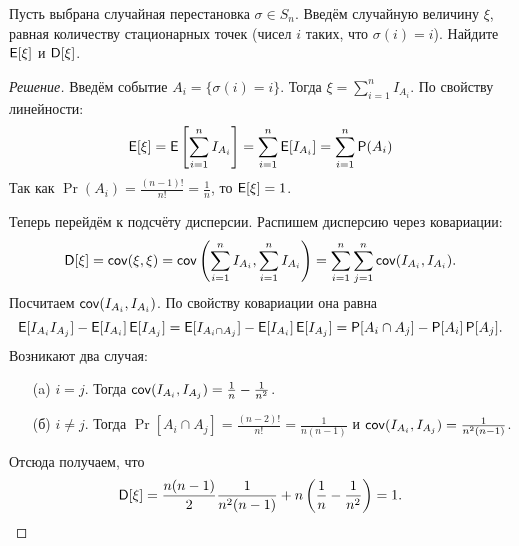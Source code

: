 \begin{problem}
    Пусть выбрана случайная перестановка \(\sigma \in S_n\). Введём случайную величину \(\xi\), равная количеству стационарных точек (чисел \(i\) таких, что \(\sigma(i) = i\)). Найдите \(\operatorname{\mathsf{E}}[\xi]\) и \(\operatorname{\mathsf{D}}[\xi]\).
\end{problem}
\begin{proof}[Решение]
    Введём событие \(A_i = \{\sigma(i) = i\}\). Тогда \(\xi = \sum\limits_{i = 1}^{n} I_{A_i}\).
    По свойству линейности:
    \[\operatorname{\mathsf{E}}[\xi] = \operatorname{\mathsf{E}}\left[\sum_{i = 1}^{n} I_{A_i}\right] = \sum_{i = 1}^{n} \operatorname{\mathsf{E}}[I_{A_i}] = \sum_{i = 1}^{n} \operatorname{\mathsf{P}}(A_i)\]
    Так как \(\Pr(A_i) = \frac{(n - 1)!}{n!} = \frac{1}{n}\), то \(\operatorname{\mathsf{E}}[\xi] = 1\).
    
    Теперь перейдём к подсчёту дисперсии. Распишем дисперсию через ковариации:
    \[\operatorname{\mathsf{D}}[\xi] = \operatorname{\mathsf{cov}}(\xi, \xi) = \operatorname{\mathsf{cov}}\left(\sum_{i = 1}^{n} I_{A_i}, \sum_{i = 1}^{n} I_{A_i}\right) = \sum_{i = 1}^{n} \sum_{j = 1}^{n} \operatorname{\mathsf{cov}}(I_{A_i}, I_{A_i}).\]
    Посчитаем \(\operatorname{\mathsf{cov}}(I_{A_i}, I_{A_i})\). По свойству ковариации она равна \[\operatorname{\mathsf{E}}[I_{A_i}I_{A_j}] - \operatorname{\mathsf{E}}[I_{A_i}]\operatorname{\mathsf{E}}[I_{A_j}] = \operatorname{\mathsf{E}}[I_{A_i \cap A_j}] - \operatorname{\mathsf{E}}[I_{A_i}]\operatorname{\mathsf{E}}[I_{A_j}] = \operatorname{\mathsf{P}}[A_i \cap A_j] - \operatorname{\mathsf{P}}[A_i]\operatorname{\mathsf{P}}[A_j].\] Возникают два случая:
    \begin{itemize}
        \item[(a)] \(i = j\). Тогда \(\operatorname{\mathsf{cov}}(I_{A_i}, I_{A_j}) = \frac{1}{n} - \frac{1}{n^2}\).
        \item[(б)] \(i \neq j\). Тогда \(\Pr[A_i \cap A_j] = \frac{(n - 2)!}{n!} = \frac{1}{n(n - 1)}\) и \(\operatorname{\mathsf{cov}}(I_{A_i}, I_{A_j}) = \frac{1}{n^2(n - 1)}\).
    \end{itemize}
    Отсюда получаем, что \[\operatorname{\mathsf{D}}[\xi] = \frac{n(n - 1)}{2}\frac{1}{n^2(n - 1)} + n\left(\frac{1}{n} - \frac{1}{n^2}\right) = 1.\qedhere\]
\end{proof}